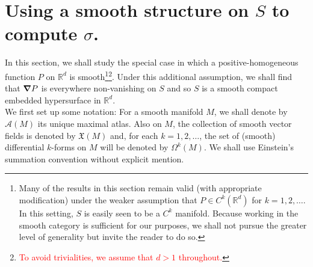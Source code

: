 \documentclass[11pt]{article}
\begin{document}
\section{Using a smooth structure on $S$ to compute $\sigma$.}\label{sec:SigmaForSmoothP}

\noindent In this section, we shall study the special case in which a positive-homogeneous function $P$ on $\mathbb{R}^d$ is smooth\footnote{Many of the results in this section remain valid (with appropriate modification) under the weaker assumption that $P\in C^k(\mathbb{R}^d)$ for $k=1,2,\dots$. In this setting, $S$ is easily seen to be a $C^k$ manifold. Because working in the smooth category is sufficient for our purposes, we shall not pursue the greater level of generality but invite the reader to do so.}\footnote{\textcolor{red}{To avoid trivialities, we assume that $d>1$ throughout.}}.
Under this additional assumption, we shall find that $\grad P$ is everywhere non-vanishing on $S$ and so $S$ is a smooth compact embedded hypersurface in $\mathbb{R}^d$.\\

\noindent We first set up some notation: For a smooth manifold $M$, we shall denote by $\mathcal{A}(M)$ its unique maximal atlas. Also on $M$, the collection of smooth vector fields is denoted by $\mathfrak{X}(M)$ and, for each $k=1,2,\dots$, the set of (smooth) differential $k$-forms on $M$ will be denoted by $\Omega^k(M)$. We shall use Einstein's summation convention without explicit mention.
\end{document}
